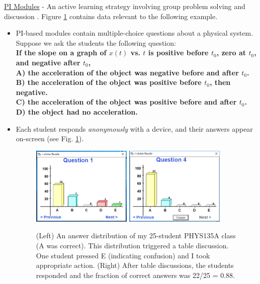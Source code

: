 \documentclass[../../../main.tex]{subfiles}
\begin{document}
\underline{PI Modules} - An active learning strategy involving group problem solving and discussion \cite{mazur2013peer} \cite{AAPTPI} \cite{PhysPort}.  Figure \ref{fig:exampleData} contains data relevant to the following example.
\begin{itemize}
\item PI-based modules contain multiple-choice questions about a physical system.  Suppose we ask the students the following question: \\ \vspace{0.5cm} \textbf{If the slope on a graph of $x(t)$ vs. $t$ is positive before $t_0$, zero at $t_0$, and negative after $t_0$, \\ \vspace{0.5cm} A) the acceleration of the object was negative before and after $t_0$.  \\ B) the acceleration of the object was positive before $t_0$, then negative. \\ C) the acceleration of the object was positive before and after $t_0$. \\ D) the object had no acceleration.}
\item Each student responds \textit{anonymously} with a device, and their answers appear on-screen (see Fig. \ref{fig:exampleData}).
\begin{figure}
\centering
\includegraphics[width=0.45\textwidth,trim=0.15cm 1cm 0.15cm 2cm,clip=true]{figures/FirstData.PNG}
\includegraphics[width=0.45\textwidth,trim=0.15cm 1cm 0.15cm 2cm,clip=true]{figures/SecondData.PNG}
\caption{\label{fig:exampleData} (Left) An answer distribution of my 25-student PHYS135A class (A was correct).  This distribution triggered a table discussion.  One student pressed E (indicating confusion) and I took appropriate action.  (Right) After table discussions, the students responded and the fraction of correct answers was 22/25 = 0.88.}

\end{figure}
\end{itemize}
\end{document}

